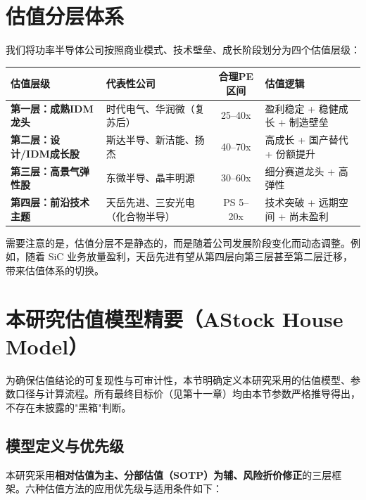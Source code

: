 \section{估值分层体系}

我们将功率半导体公司按照商业模式、技术壁垒、成长阶段划分为四个估值层级：

\begin{exhibitbox}[表 7-2：功率半导体公司估值分层体系]
\centering
\small
\begin{tabularx}{\textwidth}{l X c L{3.5cm}}
\toprule
\textbf{估值层级} & \textbf{代表性公司} & \textbf{合理PE区间} & \textbf{估值逻辑} \\
\midrule
{}
\textbf{第一层：成熟IDM龙头} & 时代电气、华润微（复苏后） & 25–40x & 盈利稳定 + 稳健成长 + 制造壁垒 \\
\midrule
{}
\textbf{第二层：设计/IDM成长股} & 斯达半导、新洁能、扬杰 & 40–70x & 高成长 + 国产替代 + 份额提升 \\
\midrule
{}
\textbf{第三层：高景气弹性股} & 东微半导、晶丰明源 & 30–60x & 细分赛道龙头 + 高弹性 \\
\midrule
{}
\textbf{第四层：前沿技术主题} & 天岳先进、三安光电（化合物半导） & PS 5–20x & 技术突破 + 远期空间 + 尚未盈利 \\
\bottomrule
\end{tabularx}
\end{exhibitbox}

需要注意的是，估值分层不是静态的，而是随着公司发展阶段变化而动态调整。例如，随着 SiC 业务放量盈利，天岳先进有望从第四层向第三层甚至第二层迁移，带来估值体系的切换。

\section{本研究估值模型精要（AStock House Model）}

为确保估值结论的可复现性与可审计性，本节明确定义本研究采用的估值模型、参数口径与计算流程。所有最终目标价（见第十一章）均由本节参数严格推导得出，不存在未披露的"黑箱"判断。

\subsection{模型定义与优先级}

本研究采用\textbf{相对估值为主、分部估值（SOTP）为辅、风险折价修正}的三层框架。六种估值方法的应用优先级与适用条件如下：

